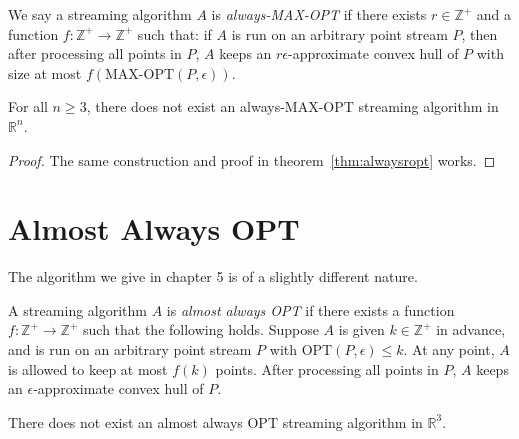 \begin{definition}
We say a streaming algorithm $A$ is \emph{always-MAX-OPT} if there exists $r \in \mathbb{Z}^+$ and a function $f : \mathbb{Z}^+ \to \mathbb{Z}^+$ such that: if $A$ is run on an arbitrary point stream $P$, then after processing all points in $P$, $A$ keeps an $r\epsilon$-approximate convex hull of $P$ with size at most $f(\mbox{MAX-OPT}(P, \epsilon))$.
\end{definition}

\begin{theorem}
For all $n \geq 3$, there does not exist an always-MAX-OPT streaming algorithm in $\mathbb{R}^n$.
\end{theorem}

\begin{proof}
The same construction and proof in theorem~\ref{thm:alwaysropt} works.
\end{proof}

\section{Almost Always OPT}

The algorithm we give in chapter 5 is of a slightly different nature.

\begin{definition}
A streaming algorithm $A$ is \emph{almost always OPT} if there exists a function $f : \mathbb{Z}^+ \to \mathbb{Z}^+$ such that the following holds. Suppose $A$ is given $k \in \mathbb{Z}^+$ in advance, and is run on an arbitrary point stream $P$ with $\mbox{OPT}(P, \epsilon) \leq k$. At any point, $A$ is allowed to keep at most $f(k)$ points. After processing all points in $P$, $A$ keeps an $\epsilon$-approximate convex hull of $P$.
\end{definition}

\begin{theorem}
There does not exist an almost always OPT streaming algorithm in $\mathbb{R}^3$.
\label{thm:almostalwaysopt}
\end{theorem}

